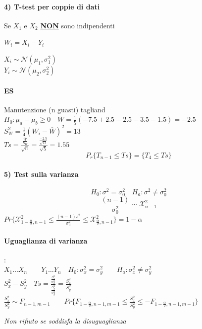 \documentclass[]{article}
\begin{document}
    \paragraph{4) T-test per coppie di dati}
    Se $X_1$ e $X_2$ \underline{\textbf{NON}} sono indipendenti \\
    \begin{minipage}{0.5\textwidth}
        $W_i = X_i - Y_i$
    \end{minipage}
    \begin{minipage}{0.5\textwidth}
        $X_i \sim \mathcal{N}(\mu_1, \sigma_1^2)$ \\
        $Y_i \sim \mathcal{N}(\mu_2, \sigma_2^2)$
    \end{minipage}
    \paragraph{ES} Manutenzione (n guasti) tagliand \\[2ex]
    $H_0 : \mu_a - \mu_b \geq 0 \quad \overline{W} = \frac{1}{5}(-7.5 + 2.5 - 2.5 - 3.5 -1.5) = -2.5$ \\[2ex]
    $S^2_W = \frac{1}{4}(W_i - \overline{W})^2 = 13$ \\[2ex]
    $Ts = \frac{\frac{\overline{W}}{S_W}}{\sqrt{n}} = \frac{\frac{-2.5}{\sqrt{13}}}{\sqrt{5}} = 1.55$
    \[ P_r \{ T_{n-1} \leq Ts \} = \{ T_4 \leq Ts \}\]
    \paragraph{5) Test sulla varianza}
    \[ H_0 : \sigma^2 = \sigma^2_0 \quad H_a : \sigma^2 \not = \sigma^2_0 \]
    \[ \frac{(n-1)}{\sigma^2_0} \sim \mathcal{X}^2_{n-1} \]
    $Pr \{ \mathcal{X}^2_{1-\frac{\alpha}{2}, n-1} \leq \frac{(n-1) s^2}{\sigma^2_0} \leq \mathcal{X}^2_{\frac{\alpha}{2}, n-1}\} = 1 -\alpha$
    \paragraph{Uguaglianza di varianza}: \\
    $X_1 \ldots X_n \qquad Y_1 \ldots Y_n \quad H_0 : \sigma^2_x = \sigma^2_y \qquad H_a : \sigma^2_x \not = \sigma^2_y$ \\[2ex]
    $\displaystyle S^2_x - S^2_y \quad Ts = \frac{\frac{S^2_x}{\sigma^2_x}}{\frac{S^2_y}{\sigma^2_y}} = \frac{S^2_x}{S^2_y}$ \\[4ex]
    $\frac{S^2_x}{S^2_y} \sim F_{n-1, m-1} \qquad Pr \{ F_{1-\frac{\alpha}{2}, n-1, m-1} \leq \frac{S^2_x}{S^2_y} \leq - F_{1-\frac{\alpha}{2}, n-1, m-1} \}$ \\
    \centerline{\textit{Non rifiuto se soddisfa la disuguaglianza}}
\end{document}
